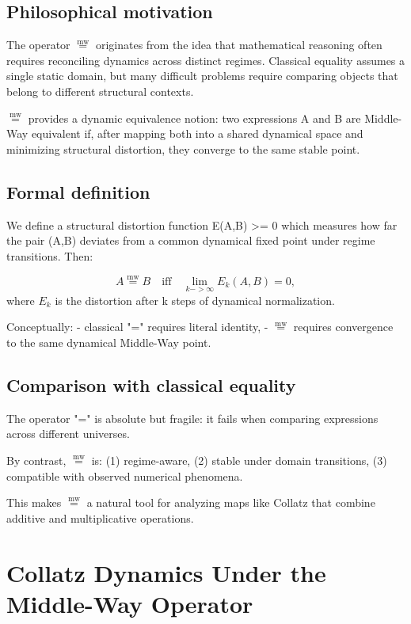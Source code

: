 \documentclass[11pt]{article}
\newcommand{\mweq}{\mathrel{\overset{\mathrm{mw}}{=}}}
\theoremstyle{definition}
\theoremstyle{remark}
\begin{document}
\subsection{Philosophical motivation}

The operator $\mweq$ originates from the idea that mathematical reasoning
often requires reconciling dynamics across distinct regimes. Classical
equality assumes a single static domain, but many difficult problems
require comparing objects that belong to different structural contexts.

$\mweq$ provides a dynamic equivalence notion: two expressions A and B are
Middle-Way equivalent if, after mapping both into a shared dynamical
space and minimizing structural distortion, they converge to the same
stable point.

\subsection{Formal definition}

We define a structural distortion function E(A,B) >= 0 which measures
how far the pair (A,B) deviates from a common dynamical fixed point
under regime transitions. Then:

\[
  A \mweq B
  \quad \text{iff} \quad
  \lim_{k->\infty} E_k(A,B) = 0,
\]
where $E_k$ is the distortion after k steps of dynamical normalization.

Conceptually:
- classical "=" requires literal identity,
- $\mweq$ requires convergence to the same dynamical Middle-Way point.

\subsection{Comparison with classical equality}

The operator "=" is absolute but fragile: it fails when comparing
expressions across different universes.

By contrast, $\mweq$ is:
(1) regime-aware,
(2) stable under domain transitions,
(3) compatible with observed numerical phenomena.

This makes $\mweq$ a natural tool for analyzing maps like Collatz that
combine additive and multiplicative operations.

\section{Collatz Dynamics Under the Middle-Way Operator}
\end{document}
